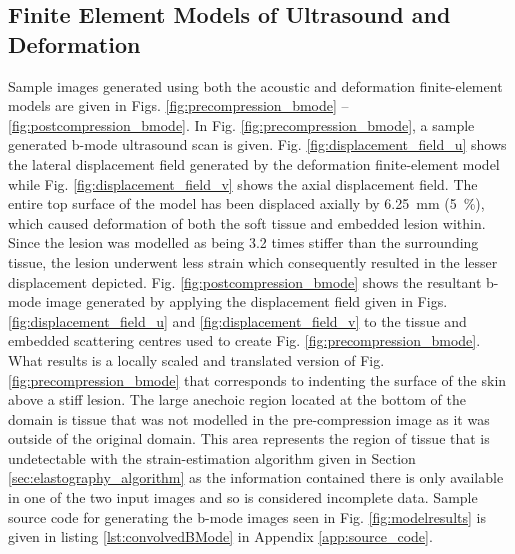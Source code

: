		\subsection{Finite Element Models of Ultrasound and Deformation}
			\label{sec:femresults}
			Sample images generated using both the acoustic and deformation finite-element models are given in Figs. \ref{fig:precompression_bmode} -- \ref{fig:postcompression_bmode}. In Fig. \ref{fig:precompression_bmode}, a sample generated b-mode ultrasound scan is given. Fig. \ref{fig:displacement_field_u} shows the lateral displacement field generated by the deformation finite-element model while Fig. \ref{fig:displacement_field_v} shows the axial displacement field. The entire top surface of the model has been displaced axially by \SI{6.25}{\mm} (\SI{5}{\percent}), which caused deformation of both the soft tissue and embedded lesion within. Since the lesion was modelled as being 3.2 times stiffer than the surrounding tissue, the lesion underwent less strain which consequently resulted in the lesser displacement depicted. Fig. \ref{fig:postcompression_bmode} shows the resultant b-mode image generated by applying the displacement field given in Figs. \ref{fig:displacement_field_u} and \ref{fig:displacement_field_v} to the tissue and embedded scattering centres used to create Fig. \ref{fig:precompression_bmode}. What results is a locally scaled and translated version of Fig. \ref{fig:precompression_bmode} that corresponds to indenting the surface of the skin above a stiff lesion. The large anechoic region located at the bottom of the domain is tissue that was not modelled in the pre-compression image as it was outside of the original domain. This area represents the region of tissue that is undetectable with the strain-estimation algorithm given in Section \ref{sec:elastography_algorithm} as the information contained there is only available in one of the two input images and so is considered incomplete data. Sample source code for generating the b-mode images seen in Fig. \ref{fig:modelresults} is given in listing \ref{lst:convolvedBMode} in Appendix \ref{app:source_code}.

